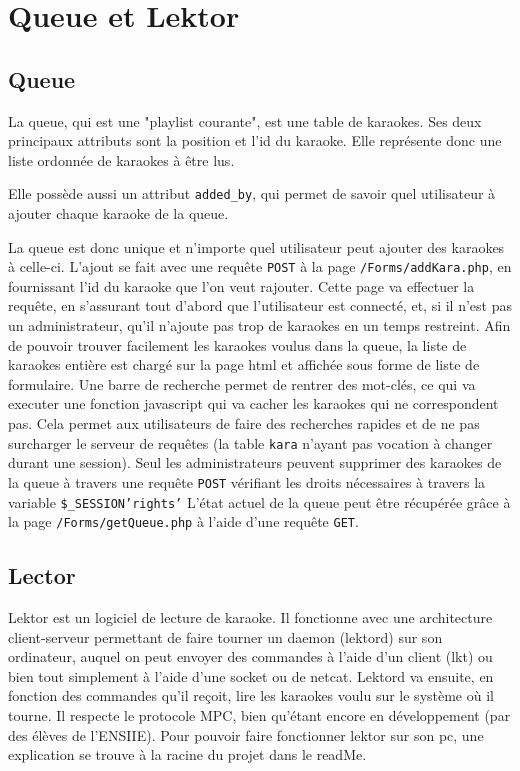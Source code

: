 \section{Queue et Lektor}
\subsection{Queue}

La queue, qui est une "playlist courante", est une table de karaokes. Ses deux principaux attributs sont la position et l'id du karaoke. Elle représente donc une liste ordonnée de karaokes à être lus.

Elle possède aussi un attribut \texttt{added\_by}, qui permet de savoir quel utilisateur à ajouter chaque karaoke de la queue.

La queue est donc unique et n'importe quel utilisateur peut ajouter des karaokes à celle-ci.
L'ajout se fait avec une requête \texttt{POST} à la page \texttt{/Forms/addKara.php}, en fournissant l'id du karaoke que l'on veut rajouter. Cette page va effectuer la requête, en s'assurant tout d'abord que l'utilisateur est connecté, et, si il n'est pas un administrateur, qu'il n'ajoute pas trop de karaokes en un temps restreint.
Afin de pouvoir trouver facilement les karaokes voulus dans la queue, la liste de karaokes entière est chargé sur la page html et affichée sous forme de liste de formulaire. Une barre de recherche permet de rentrer des mot-clés, ce qui va executer une fonction javascript qui va cacher les karaokes qui ne correspondent pas. Cela permet aux utilisateurs de faire des recherches rapides et de ne pas surcharger le serveur de requêtes (la table \texttt{kara} n'ayant pas vocation à changer durant une
session).
Seul les administrateurs peuvent supprimer des karaokes de la queue à travers une requête \texttt{POST} vérifiant les droits nécessaires à travers la variable \texttt{\$\_SESSION{\lbrack'rights'\rbrack}} 
L'état actuel de la queue peut être récupérée grâce à la page \texttt{/Forms/getQueue.php} à l'aide d'une requête \texttt{GET}.

\subsection{Lector}

Lektor est un logiciel de lecture de karaoke. Il fonctionne avec une architecture client-serveur permettant de faire tourner un daemon (lektord) sur son ordinateur, auquel on peut envoyer des commandes à l'aide d'un client (lkt) ou bien tout simplement à l'aide d'une socket ou de netcat. Lektord va ensuite, en fonction des commandes qu'il reçoit, lire les karaokes voulu sur le système où il tourne. Il respecte le protocole MPC, bien qu'étant encore en développement (par des élèves de
l'ENSIIE).\newline
Pour pouvoir faire fonctionner lektor sur son pc, une explication se trouve à la racine du projet dans le readMe.\newline

